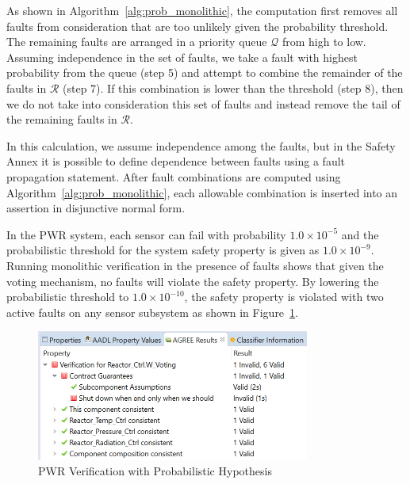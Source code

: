 As shown in Algorithm~\ref{alg:prob_monolithic}, the computation first removes all faults from consideration that are too unlikely given the probability threshold. The remaining faults are arranged in a priority queue $\mathcal{Q}$ from high to low. Assuming independence in the set of faults, we take a fault with highest probability from the queue (step 5) and attempt to combine the remainder of the faults in $\mathcal{R}$ (step 7). If this combination is lower than the threshold (step 8), then we do not take into consideration this set of faults and instead remove the tail of the remaining faults in $\mathcal{R}$. 
 
In this calculation, we assume independence among the faults, but in the Safety Annex it is possible to define dependence between faults using a fault propagation statement. After fault combinations are computed using Algorithm~\ref{alg:prob_monolithic}, each allowable combination is inserted into an assertion in disjunctive normal form. 

In the PWR system, each sensor can fail with probability $1.0 \times 10^{-5}$ and the probabilistic threshold for the system safety property is given as $1.0 \times 10^{-9}$. Running monolithic verification in the presence of faults shows that given the voting mechanism, no faults will violate the safety property. By lowering the probabilistic threshold to $1.0 \times 10^{-10}$, the safety property is violated with two active faults on any sensor subsystem as shown in Figure~\ref{fig:probPWRVerif}.

\begin{figure}[h!]
		\includegraphics[width=0.8\textwidth]{images/probPWRVerif.png}
	\caption{PWR Verification with Probabilistic Hypothesis}
	\label{fig:probPWRVerif}
\end{figure}

